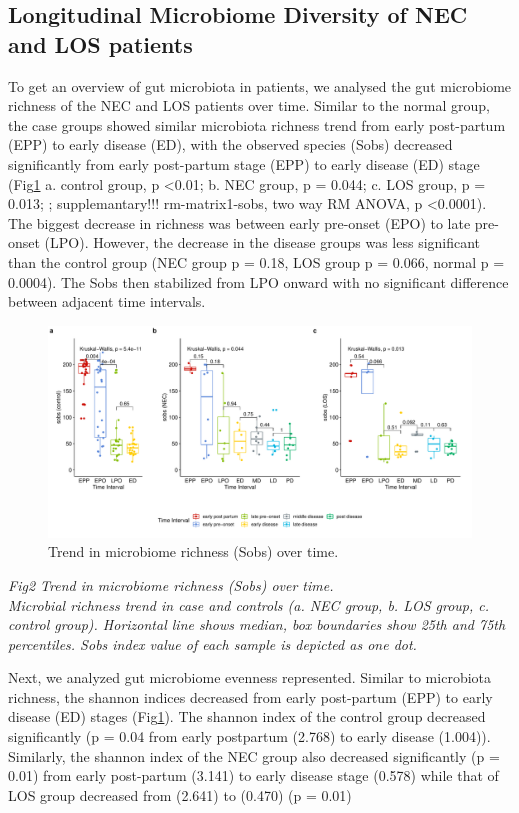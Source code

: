 \documentclass[fleqn,10pt]{wlpeerj} %
\begin{document}
   \subsection*{Longitudinal Microbiome Diversity of NEC and LOS patients}
    To get an overview of gut microbiota in patients, we analysed the gut microbiome richness of the NEC and LOS patients over time.  Similar to the normal group, the case groups showed similar microbiota richness trend from early post-partum (EPP) to early disease (ED), with the observed species (Sobs) decreased significantly from early post-partum stage (EPP) to early disease (ED) stage (Fig\ref{fig:sobs-group-time} a. control group, p \textless 0.01; b. NEC group, p = 0.044; c. LOS group, p = 0.013; ; supplemantary!!! rm-matrix1-sobs, two way RM ANOVA, p \textless 0.0001).  The biggest decrease in richness was between early pre-onset (EPO) to late pre-onset (LPO).  However, the decrease in the disease groups was less significant than the control group (NEC group p = 0.18, LOS group p = 0.066, normal p = 0.0004). The Sobs then stabilized from LPO onward with no significant difference between adjacent time intervals.

    \begin{figure}[ht]\centering
      \includegraphics[width=\linewidth]{figure/sobs-group-time2.pdf}
      \caption{Trend in microbiome richness (Sobs) over time.}
      \label{fig:sobs-group-time}
    \end{figure}

    \textit{Fig2 Trend in microbiome richness (Sobs) over time. \\ Microbial richness trend in case and controls (a. NEC group, b. LOS group, c. control group). Horizontal line shows median, box boundaries show 25th and 75th percentiles. Sobs index value of each sample is depicted as one dot. }

    Next, we analyzed gut microbiome evenness represented. Similar to microbiota richness,  the shannon indices decreased from early post-partum (EPP) to early disease (ED) stages (Fig\ref{fig:sobs-group-time}). The shannon index of the control group decreased significantly (p = 0.04 from early postpartum (2.768) to early disease (1.004)).  Similarly, the shannon index of the NEC group also decreased significantly (p = 0.01) from early post-partum (3.141) to early disease stage (0.578) while that of LOS group decreased from (2.641) to (0.470) (p = 0.01)
\end{document}

